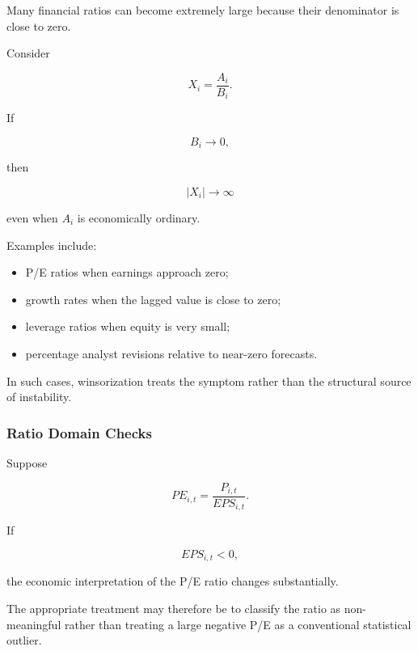 \documentclass[11pt,a4paper]{article}
\begin{document}
Many financial ratios can become extremely large because their denominator is
close to zero.

Consider

\begin{equation}
X_i
=
\frac{A_i}{B_i}.
\end{equation}

If

\begin{equation}
B_i
\rightarrow
0,
\end{equation}

then

\begin{equation}
|X_i|
\rightarrow
\infty
\end{equation}

even when $A_i$ is economically ordinary.

Examples include:

\begin{itemize}
    \item P/E ratios when earnings approach zero;
    \item growth rates when the lagged value is close to zero;
    \item leverage ratios when equity is very small;
    \item percentage analyst revisions relative to near-zero forecasts.
\end{itemize}

In such cases, winsorization treats the symptom rather than the structural
source of instability.


\subsubsection{Ratio Domain Checks}

Suppose

\begin{equation}
PE_{i,t}
=
\frac{
P_{i,t}
}{
EPS_{i,t}
}.
\end{equation}

If

\begin{equation}
EPS_{i,t}<0,
\end{equation}

the economic interpretation of the P/E ratio changes substantially.

The appropriate treatment may therefore be to classify the ratio as
non-meaningful rather than treating a large negative P/E as a conventional
statistical outlier.
\end{document}
